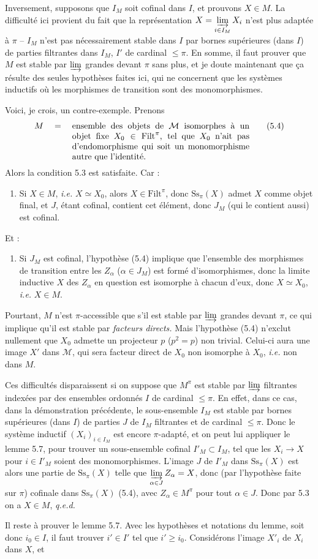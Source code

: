 \documentclass[11pt]{article}
\newcommand{\msp}[1]{\marginpar{\footnotesize [#1]}}
\newcommand{\cM}{\mathcal{M}}
\newcommand{\Filt}{\mathrm{Filt}}
\newcommand{\Ss}{\mathrm{Ss}}
\begin{document}
Inversement, supposons que $I_M$ soit cofinal dans $I$, et prouvons $X \in M$. La difficulté ici provient du fait que la représentation $X = \varinjlim\limits_{i\in I_M} X_i$ n'est plus adaptée à $\pi$ -- $I_M$ n'est pas nécessairement stable dans $I$ par bornes supérieures (dans $I$) de parties filtrantes dans $I_M$, $I'$ de cardinal $\leq \pi$. En somme, il faut
\msp{page 54}
prouver que $M$ est stable par $\varinjlim$ grandes devant $\pi$ sans plus, et je doute maintenant que ça résulte des seules hypothèses faites ici, qui ne concernent que les systèmes inductifs où les morphismes de transition sont des monomorphismes.

Voici, je crois, un contre-exemple. Prenons
\[
M \quad = \quad \parbox[t]{0.6\textwidth}{ensemble des objets de $\cM$ isomorphes à un objet fixe $X_0 \in \Filt^{\pi}$, tel que $X_0$ n'ait pas d'endomorphisme qui soit un monomorphisme autre que l'identité.}
\tag*{(5.4)}
\]
Alors la condition 5.3 est satisfaite. Car :
\begin{enumerate}[nosep]
\item[\textit{a})] Si $X \in M$, \textit{i.e.} $X \simeq X_0$, alors $X \in \Filt^{\pi}$, donc $\Ss_{\pi}(X)$ admet $X$ comme objet final, et $J$, étant cofinal, contient cet élément, donc $J_M$ (qui le contient aussi) est cofinal.
\end{enumerate}
Et :
\begin{enumerate}[nosep]
\item[\textit{b})] Si $J_M$ est cofinal, l'hypothèse (5.4) implique que l'ensemble des morphismes de transition entre les $Z_{\alpha}$ ($\alpha \in J_M$) est formé d'isomorphismes, donc la limite inductive $X$ des $Z_{\alpha}$ en question est isomorphe à chacun d'eux, donc $X \simeq X_0$, \textit{i.e.} $X \in M$.
\end{enumerate}
Pourtant, $M$ n'est $\pi$-accessible que s'il est stable par $\varinjlim$ grandes devant $\pi$, ce qui implique qu'il est stable par \textit{facteurs directs.} Mais l'hypothèse
\msp{page 55}
(5.4) n'exclut nullement que $X_0$ admette un projecteur $p$ ($p^{2} = p$) non trivial. Celui-ci aura une image $X'$ dans $\cM$, qui sera facteur direct de $X_0$ non isomorphe à $X_0$, \textit{i.e.} non dans $M$.

Ces difficultés disparaissent si on suppose que $M^{\pi}$ est stable par $\varinjlim$ filtrantes indexées par des ensembles ordonnés $I$ de cardinal $\leq \pi$. En effet, dans ce cas, dans la démonstration précédente, le sous-ensemble $I_M$ est stable par bornes supérieures (dans $I$) de parties $J$ de $I_M$ filtrantes et de cardinal $\leq \pi$. Donc le système inductif $(X_i)_{i\in I_M}$ est encore $\pi$-adapté, et on peut lui appliquer le lemme 5.7, pour trouver un sous-ensemble cofinal $I'_M \subset I_M$, tel que les $X_i \longrightarrow X$ pour $i \in I'_M$ soient des monomorphismes. L'image $J$ de $I'_M$ dans $\Ss_{\pi}(X)$ est alors une partie de $\Ss_{\pi}(X)$ telle que $\varinjlim\limits_{\alpha\in J} Z_{\alpha} = X$, donc (par l'hypothèse faite sur $\pi$) cofinale dans $\Ss_{\pi}(X)$ (5.4), avec $Z_{\alpha} \in M^{\pi}$ pour tout $\alpha \in J$. Donc par 5.3 on a $X \in M$, \textit{q.e.d.}

\msp{page 56}
Il reste à prouver le lemme 5.7. Avec les hypothèses et notations du lemme, soit donc $i_0 \in I$, il faut trouver $i' \in I'$ tel que $i' \geq i_0$. Considérons l'image $X'_i$ de $X_i$ dans $X$, et
\end{document}
